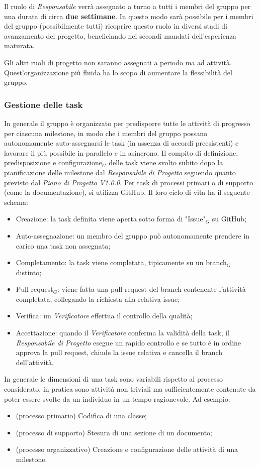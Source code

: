 Il ruolo di \textit{Responsabile} verrà assegnato a turno a tutti i membri del gruppo per una durata di circa \textbf{due settimane}. In questo modo sarà possibile per i membri del gruppo (possibilmente tutti) ricoprire questo ruolo in diversi stadi di avanzamento del progetto, beneficiando nei secondi mandati dell'esperienza maturata.

Gli altri ruoli di progetto non saranno assegnati a periodo ma ad attività. Quest'organizzazione più fluida ha lo scopo di aumentare la flessibilità del gruppo.

\subsubsection{Gestione delle task}
In generale il gruppo è organizzato per predisporre tutte le attività di progresso per ciascuna milestone, in modo che i membri del gruppo possano autonomamente auto-assegnarsi le task (in assenza di accordi preesistenti) e lavorare il più possibile in parallelo e in asincrono. Il compito di definizione, predisposizione e configurazione$_G$ delle task viene svolto subito dopo la pianificazione delle milestone dal \textit{Responsabile di Progetto} seguendo quanto previsto dal \textit{Piano di Progetto V1.0.0}.
Per task di processi primari o di supporto (come la documentazione), si utilizza GitHub. Il loro ciclo di vita ha il seguente schema:
\begin{itemize}
  \item Creazione: la task definita viene aperta sotto forma di "Issue"$_G$ su GitHub;
  \item Auto-assegnazione: un membro del gruppo può autonomamente prendere in carico una task non assegnata;
  \item Completamento: la task viene completata, tipicamente su un branch$_G$ distinto;
  \item Pull request$_G$: viene fatta una pull request del branch contenente l'attività completata, collegando la richiesta alla relativa issue;
  \item Verifica: un \textit{Verificatore} effettua il controllo della qualità;
  \item Accettazione: quando il \textit{Verificatore} conferma la validità della task, il \textit{Responsabile di Progetto} esegue un rapido controllo e se tutto è in ordine approva la pull request, chiude la issue relativa e cancella il branch dell'attività.
\end{itemize}

In generale le dimensioni di una task sono variabili rispetto al processo considerato, in pratica sono attività non triviali ma sufficientemente contenute da poter essere svolte da un individuo in un tempo ragionevole. Ad esempio:
\begin{itemize}
  \item (processo primario) Codifica di una classe;
  \item (processo di supporto) Stesura di una sezione di un documento;
  \item (processo organizzativo) Creazione e configurazione delle attività di una milestone.
\end{itemize}

